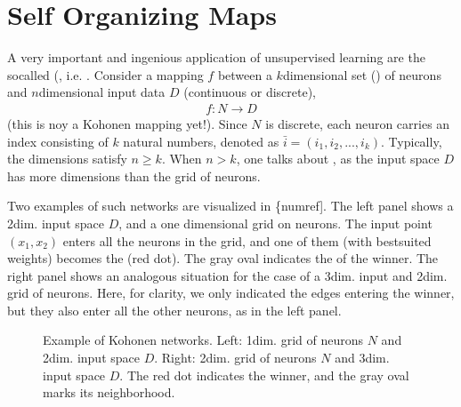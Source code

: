 \documentclass[letterpaper,10pt,english]{jupyterBook}
\let\sphinxpxdimen\pdfpxdimen\else\newdimen\sphinxpxdimen
\begin{document}
\chapter{Self Organizing Maps}
\label{\detokenize{docs/som:self-organizing-maps}}\label{\detokenize{docs/som::doc}}
\sphinxAtStartPar
A very important and ingenious application of unsupervised learning are the so\sphinxhyphen{}called  (, i.e. . Consider a mapping \(f\) between a  \(k\)\sphinxhyphen{}dimensional set () of neurons and \(n\)\sphinxhyphen{}dimensional input data \(D\) (continuous or discrete),
\begin{equation*}
\begin{split}
f: N \to D
\end{split}
\end{equation*}
\sphinxAtStartPar
(this is noy a Kohonen mapping yet!).
Since \(N\) is discrete, each neuron carries an index consisting of \(k\) natural numbers, denoted as \(\bar {i} = (i_1, i_2, ..., i_k)\). Typically, the dimensions satisfy \(n \ge k\). When \(n > k\), one talks about , as the input space \(D\) has more dimensions than the grid of neurons.

\sphinxAtStartPar
Two examples of such networks are visualized in \{numref{]}. The left panel shows a 2\sphinxhyphen{}dim. input space \(D\), and a one dimensional grid on neurons. The input point \((x_1,x_2)\) enters all the neurons in the grid, and one of them (with best\sphinxhyphen{}suited weights) becomes the  (red dot). The gray oval indicates the  of the winner. The right panel shows an analogous situation for the case of a 3\sphinxhyphen{}dim. input and 2\sphinxhyphen{}dim. grid of neurons. Here, for clarity, we only indicated the edges entering the winner, but they also enter all the other neurons, as in the left panel.

\begin{figure}[htbp]
\centering
\capstart

\noindent\sphinxincludegraphics[width=500\sphinxpxdimen]{{koha}.png}
\caption{Example of Kohonen networks. Left: 1\sphinxhyphen{}dim. grid of neurons \(N\) and 2\sphinxhyphen{}dim. input space \(D\). Right: 2\sphinxhyphen{}dim. grid of neurons \(N\) and 3\sphinxhyphen{}dim. input space \(D\). The red dot indicates the winner, and the gray oval marks its neighborhood.}\label{\detokenize{docs/som:koh-fig}}\end{figure}
\end{document}

